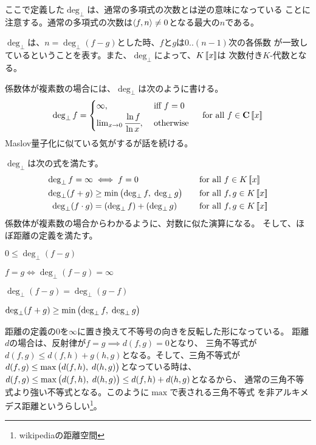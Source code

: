 {	ここで定義した$\deg_\bot$は、通常の多項式の次数とは逆の意味になっている
	ことに注意する。通常の多項式の次数は$\mathinner{\langle{f,n}\rangle}\neq0$となる最大の$n$である。

	$\deg_\bot$は、$n=\deg_\bot(f-g)$とした時、$f$と$g$は$0..(n-1)$次の各係数
	が一致しているということを表す。また、$\deg_\bot$によって、$K\mathinner{[\![{x}]\!]}$は
	次数付き$K$-代数となる。

	係数体が複素数の場合には、$\deg_\bot$は次のように書ける。
	\begin{equation*}\begin{split}
		\deg_\bot f = \begin{cases}
			\infty, &\text{ iff } f = 0 \\
			\lim_{x\to0}\cfrac{\ln f}{\ln x}, &\text{ otherwise } \\
		\end{cases} \quad\text{for all } f\in \mathbf{C}\mathinner{[\![{x}]\!]}
	\end{split}\end{equation*}
	Maslov量子化に似ている気がするが話を続ける。

	$\deg_\bot$は次の式を満たす。
	\begin{alignat*}{2}
		\deg_\bot f= \infty &\iff f = 0 
			&&\quad\text{for all } f\in K\bblr{x} \\
		\deg_\bot(f + g) &\ge \min\plrg{\deg_\bot f,\; \deg_\bot g}
			&&\quad\text{for all } f,g\in K\bblr{x} \\
		\deg_\bot(f\cdot g) &= (\deg_\bot f) + (\deg_\bot g)
			&&\quad\text{for all } f,g\in K\bblr{x} %
	\end{alignat*}
	係数体が複素数の場合からわかるように、対数に似た演算になる。
	そして、ほぼ距離の定義を満たす。
	\begin{description}\setlength{\itemsep}{-1mm} %
		\item[非負] $0\le \deg_\bot(f - g)$
		\item[反射] $f = g\iff \deg_\bot(f - g) = \infty$
		\item[対称] $\deg_\bot(f - g) = \deg_\bot(g - f)$
		\item[三角] $\deg_\bot(f + g)\ge\min\mathinner{\bigl({\deg_\bot f,\;\deg_\bot g}\bigr)}$
	\end{description} %
	距離の定義の$0$を$\infty$に置き換えて不等号の向きを反転した形になっている。
	距離$d$の場合は、反射律が$f=g\implies d(f,g)=0$となり、
	三角不等式が$d(f,g)\le d(f,h)+g(h,g)$となる。そして、三角不等式が
	$d(f,g)\le\max\mathinner{\bigl({d(f,h),\;d(h,g)}\bigr)}$となっている時は、
	$d(f,g)\le\max\mathinner{\bigl({d(f,h),\;d(h,g)}\bigr)}\le d(f,h)+d(h,g)$となるから、
	通常の三角不等式より強い不等式となる。このように$\max$で表される三角不等式
	を非アルキメデス距離というらしい\footnote{
		wikipediaの距離空間
	}。

}

